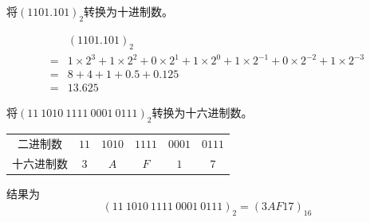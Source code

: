 \begin{frame}
  \begin{exam}{}
    将$(1101.101)_2$转换为十进制数。
  \end{exam}
  \pause 
  $$
  \begin{array}{rl}
    & (1101.101)_2 \\[0.1in]
    = & 1\times2^3+1\times2^2+0\times2^1+1\times2^0
        +1\times2^{-1}+0\times2^{-2}+1\times2^{-3}\\[0.1in]
    = & 8+4+1+0.5+0.125\\[0.1in]
    = & 13.625
  \end{array}
  $$
\end{frame}
%

%
\begin{frame}
  \begin{exam}{}
    将$(11~1010~1111~0001~0111)_2$转换为十六进制数。
  \end{exam}
  \pause 
  \begin{table}
    \centering
    \begin{tabular}{cccccc}\hline
      二进制数&$11$&$1010$&$1111$&$0001$&$0111$\\[0.1in]
      十六进制数&$3$&$A$&$F$&$1$&$7$\\ \hline
    \end{tabular}
  \end{table}
  结果为
  $$
  (11~1010~1111~0001~0111)_2=(3AF17)_{16}
  $$
\end{frame}
%
%
